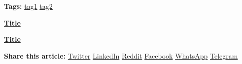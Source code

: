\documentclass[12pt]{article}
\begin{document}
\vspace{2em}
\noindent
\textbf{Tags:}
\href{https://example.com/post}{tag1} \quad
\href{https://example.com/post}{tag2}

\vspace{2em}
\noindent
\begin{minipage}{0.48\textwidth}
    \raggedright
    \textbf{\href{https://example.com/post}{\textlangle\quad Title}}
\end{minipage}
\hfill
\begin{minipage}{0.48\textwidth}
    \raggedleft
    \textbf{\href{https://example.com/post}{Title \quad\textrangle}}
\end{minipage}
\vspace{2em}

\begin{center}
  \vspace{1em}
  \textbf{Share this article:}
  \href{https://example.com/post}{Twitter} \textbar{}
  \href{https://example.com/post}{LinkedIn} \textbar{}
  \href{https://example.com/post}{Reddit} \textbar{}
  \href{https://example.com/post}{Facebook} \textbar{}
  \href{https://example.com/post}{WhatsApp} \textbar{}
  \href{https://example.com/post}{Telegram}
\end{center}
\end{document}
